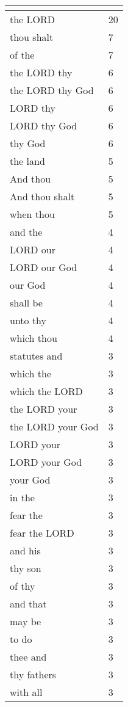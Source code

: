 \begin{center}
\begin{longtable}{|p{3.0in}|p{0.5in}|}
\hline \multicolumn{2}{c}{{ }} \\ \hline
\endfoot 
the LORD & 20\\ \hline 
thou shalt & 7\\ \hline 
of the & 7\\ \hline 
the LORD thy & 6\\ \hline 
the LORD thy God & 6\\ \hline 
LORD thy & 6\\ \hline 
LORD thy God & 6\\ \hline 
thy God & 6\\ \hline 
the land & 5\\ \hline 
And thou & 5\\ \hline 
And thou shalt & 5\\ \hline 
when thou & 5\\ \hline 
and the & 4\\ \hline 
LORD our & 4\\ \hline 
LORD our God & 4\\ \hline 
our God & 4\\ \hline 
shall be & 4\\ \hline 
unto thy & 4\\ \hline 
which thou & 4\\ \hline 
statutes and & 3\\ \hline 
which the & 3\\ \hline 
which the LORD & 3\\ \hline 
the LORD your & 3\\ \hline 
the LORD your God & 3\\ \hline 
LORD your & 3\\ \hline 
LORD your God & 3\\ \hline 
your God & 3\\ \hline 
in the & 3\\ \hline 
fear the & 3\\ \hline 
fear the LORD & 3\\ \hline 
and his & 3\\ \hline 
thy son & 3\\ \hline 
of thy & 3\\ \hline 
and that & 3\\ \hline 
may be & 3\\ \hline 
to do & 3\\ \hline 
thee and & 3\\ \hline 
thy fathers & 3\\ \hline 
with all & 3\\ \hline 

\end{longtable}
\end{center}
